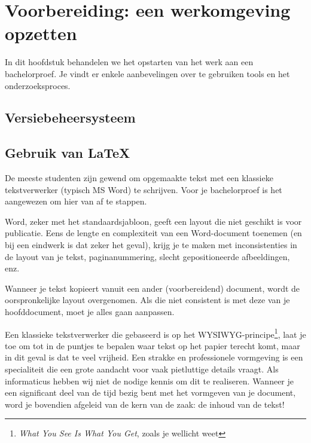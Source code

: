 \chapter{Voorbereiding: een werkomgeving opzetten}
\label{ch:voorbereiding}

In dit hoofdstuk behandelen we het opstarten van het werk aan een bachelorproef. Je vindt er enkele aanbevelingen over te gebruiken tools en het onderzoeksproces.

\section{Versiebeheersysteem}
\label{sec:versiebeheersysteem}


\section{Gebruik van {\LaTeX}}
\label{sec:gebruik-van-latex}

De meeste studenten zijn gewend om opgemaakte tekst met een klassieke tekstverwerker (typisch MS Word) te schrijven. Voor je bachelorproef is het aangewezen om hier van af te stappen.

Word, zeker met het standaardsjabloon, geeft een layout die niet geschikt is voor publicatie. Eens de lengte en complexiteit van een Word-document toenemen (en bij een eindwerk is dat zeker het geval), krijg je te maken met inconsistenties in de layout van je tekst, paginanummering, slecht gepositioneerde afbeeldingen, enz.

Wanneer je tekst kopieert vanuit een ander (voorbereidend) document, wordt de oorspronkelijke layout overgenomen. Als die niet consistent is met deze van je hoofddocument, moet je alles gaan aanpassen.

Een klassieke tekstverwerker die gebaseerd is op het WYSIWYG-principe\footnote{\emph{What You See Is What You Get}, zoals je wellicht weet}, laat je toe om tot in de puntjes te bepalen waar tekst op het papier terecht komt, maar in dit geval is dat te veel vrijheid. Een strakke en professionele vormgeving is een specialiteit die een grote aandacht voor vaak pietluttige  details vraagt. Als informaticus hebben wij niet de nodige kennis om dit te realiseren. Wanneer je een significant deel van de tijd bezig bent met het vormgeven van je document, word je bovendien afgeleid van de kern van de zaak: de inhoud van de tekst!

